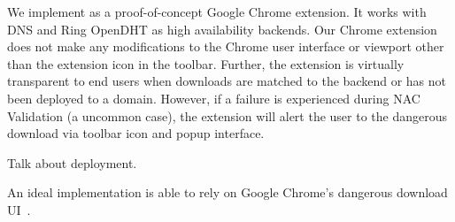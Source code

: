 We implement \SYSTEM{} as a proof-of-concept Google Chrome extension. It works
with DNS and Ring OpenDHT as high availability backends. Our Chrome extension
does not make any modifications to the Chrome user interface or viewport other
than the extension icon in the toolbar. Further, the extension is virtually
transparent to end users when downloads are matched to the backend or \SYSTEM{}
has not been deployed to a domain. However, if a failure is experienced during
NAC Validation (\ie a uncommon case), the extension will alert the user to the
dangerous download via toolbar icon and popup interface.

Talk about deployment.

An ideal implementation is able to rely on Google Chrome's dangerous download
UI~\cite{ChromeClickThrough}.
